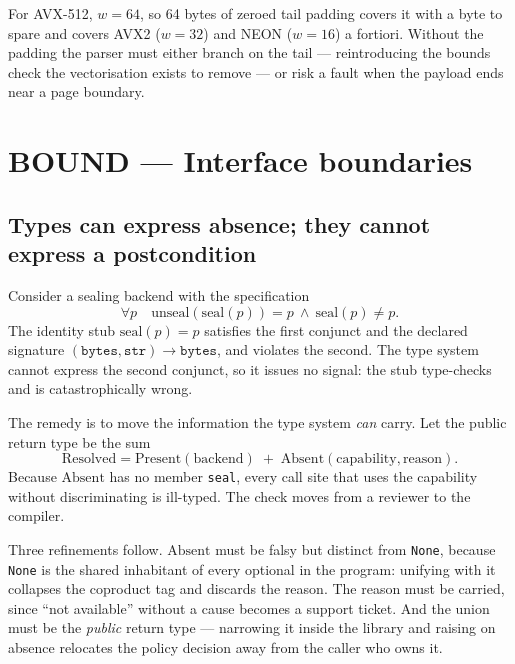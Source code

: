 \documentclass[11pt]{article}
\begin{document}
For AVX-512, $w = 64$, so 64 bytes of zeroed tail padding covers it with a byte
to spare and covers AVX2 ($w=32$) and NEON ($w=16$) a fortiori. Without the
padding the parser must either branch on the tail --- reintroducing the
bounds check the vectorisation exists to remove --- or risk a fault when the
payload ends near a page boundary.

\section{BOUND --- Interface boundaries}

\subsection{Types can express absence; they cannot express a postcondition}
\label{lbl:HS-BOUND-01}

Consider a sealing backend with the specification
\begin{equation}
\forall p \quad \mathrm{unseal}(\mathrm{seal}(p)) = p \ \wedge\ \mathrm{seal}(p) \neq p .
\end{equation}
The identity stub $\mathrm{seal}(p) = p$ satisfies the first conjunct and the
declared signature $(\mathtt{bytes}, \mathtt{str}) \to \mathtt{bytes}$, and
violates the second. The type system cannot express the second conjunct, so it
issues no signal: the stub type-checks and is catastrophically wrong.

The remedy is to move the information the type system \emph{can} carry. Let the
public return type be the sum
\begin{equation}
\mathrm{Resolved} = \mathrm{Present}(\mathrm{backend}) \;+\;
\mathrm{Absent}(\mathrm{capability}, \mathrm{reason}).
\end{equation}
Because $\mathrm{Absent}$ has no member \texttt{seal}, every call site that
uses the capability without discriminating is ill-typed. The check moves from a
reviewer to the compiler.

Three refinements follow. $\mathrm{Absent}$ must be falsy but distinct from
\texttt{None}, because \texttt{None} is the shared inhabitant of every optional
in the program: unifying with it collapses the coproduct tag and discards the
reason. The reason must be carried, since ``not available'' without a cause
becomes a support ticket. And the union must be the \emph{public} return type
--- narrowing it inside the library and raising on absence relocates the policy
decision away from the caller who owns it.
\end{document}
